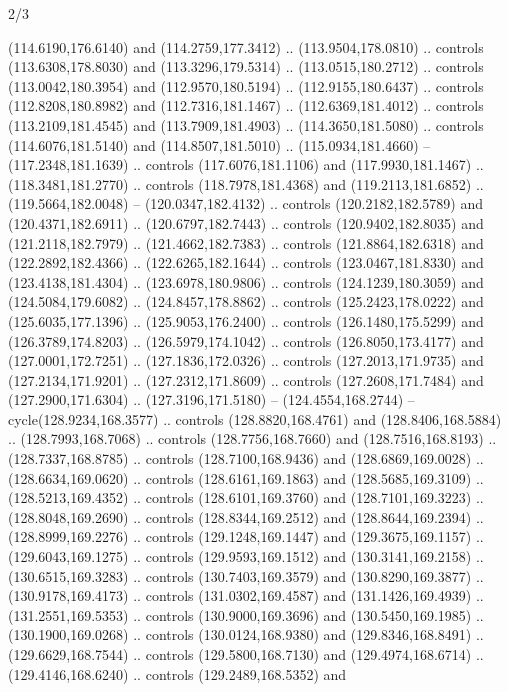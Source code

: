 \begin{flagdescription}{2/3}
\begin{scope}[shift={(0.5\flaglength,0.5)},scale=\flagwidth/320]
\begin{scope}[y=0.8pt, x=0.8pt, yscale=-1,shift={(-118.3,-146)}]
  (114.6190,176.6140) and (114.2759,177.3412) .. (113.9504,178.0810) .. controls
  (113.6308,178.8030) and (113.3296,179.5314) .. (113.0515,180.2712) .. controls
  (113.0042,180.3954) and (112.9570,180.5194) .. (112.9155,180.6437) .. controls
  (112.8208,180.8982) and (112.7316,181.1467) .. (112.6369,181.4012) .. controls
  (113.2109,181.4545) and (113.7909,181.4903) .. (114.3650,181.5080) .. controls
  (114.6076,181.5140) and (114.8507,181.5010) .. (115.0934,181.4660) --
  (117.2348,181.1639) .. controls (117.6076,181.1106) and (117.9930,181.1467) ..
  (118.3481,181.2770) .. controls (118.7978,181.4368) and (119.2113,181.6852) ..
  (119.5664,182.0048) -- (120.0347,182.4132) .. controls (120.2182,182.5789) and
  (120.4371,182.6911) .. (120.6797,182.7443) .. controls (120.9402,182.8035) and
  (121.2118,182.7979) .. (121.4662,182.7383) .. controls (121.8864,182.6318) and
  (122.2892,182.4366) .. (122.6265,182.1644) .. controls (123.0467,181.8330) and
  (123.4138,181.4304) .. (123.6978,180.9806) .. controls (124.1239,180.3059) and
  (124.5084,179.6082) .. (124.8457,178.8862) .. controls (125.2423,178.0222) and
  (125.6035,177.1396) .. (125.9053,176.2400) .. controls (126.1480,175.5299) and
  (126.3789,174.8203) .. (126.5979,174.1042) .. controls (126.8050,173.4177) and
  (127.0001,172.7251) .. (127.1836,172.0326) .. controls (127.2013,171.9735) and
  (127.2134,171.9201) .. (127.2312,171.8609) .. controls (127.2608,171.7484) and
  (127.2900,171.6304) .. (127.3196,171.5180) -- (124.4554,168.2744) --
  cycle(128.9234,168.3577) .. controls (128.8820,168.4761) and
  (128.8406,168.5884) .. (128.7993,168.7068) .. controls (128.7756,168.7660) and
  (128.7516,168.8193) .. (128.7337,168.8785) .. controls (128.7100,168.9436) and
  (128.6869,169.0028) .. (128.6634,169.0620) .. controls (128.6161,169.1863) and
  (128.5685,169.3109) .. (128.5213,169.4352) .. controls (128.6101,169.3760) and
  (128.7101,169.3223) .. (128.8048,169.2690) .. controls (128.8344,169.2512) and
  (128.8644,169.2394) .. (128.8999,169.2276) .. controls (129.1248,169.1447) and
  (129.3675,169.1157) .. (129.6043,169.1275) .. controls (129.9593,169.1512) and
  (130.3141,169.2158) .. (130.6515,169.3283) .. controls (130.7403,169.3579) and
  (130.8290,169.3877) .. (130.9178,169.4173) .. controls (131.0302,169.4587) and
  (131.1426,169.4939) .. (131.2551,169.5353) .. controls (130.9000,169.3696) and
  (130.5450,169.1985) .. (130.1900,169.0268) .. controls (130.0124,168.9380) and
  (129.8346,168.8491) .. (129.6629,168.7544) .. controls (129.5800,168.7130) and
  (129.4974,168.6714) .. (129.4146,168.6240) .. controls (129.2489,168.5352) and

\end{scope}
\end{scope}
\end{flagdescription}
